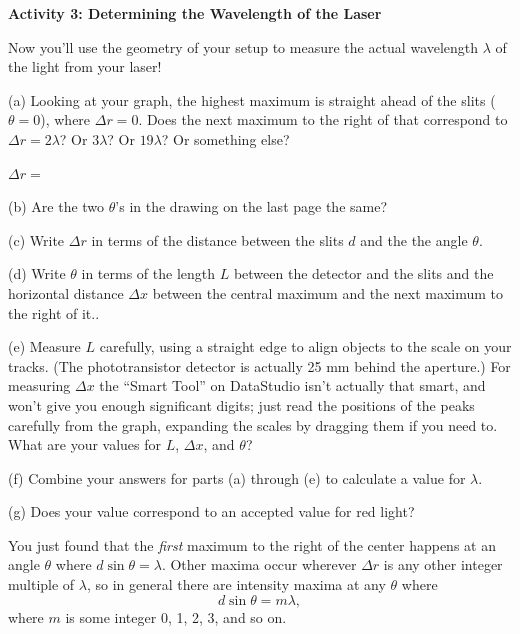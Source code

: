 \pagebreak[2]
\textbf{Activity 3: Determining the Wavelength of the Laser }

Now you'll use the geometry of your setup to measure the actual wavelength $\lambda$ of the light from your laser!

(a) Looking at your graph, the highest maximum is straight ahead of the slits ($\theta=0$), where $\Delta r=0$.  Does the next maximum to the right of that correspond to $\Delta r=2\lambda$?  Or $3\lambda$?  Or $19\lambda$?  Or something else?

\vspace{0.1in}
\hspace{0.8in}$\Delta r=$
\vspace{0.1in}

(b) Are the two $\theta$'s in the drawing on the last page the same?
\answerspace{0.3in}

(c) Write $\Delta r$ in terms of the distance between the slits $d$ and the the angle $\theta$.
\answerspace{0.5in}

(d) Write $\theta$ in terms of the length $L$ between the detector and the slits and the horizontal distance $\Delta x$ between the central maximum and the next maximum to the right of it..
\answerspace{0.5in}

(e) Measure $L$ carefully, using a straight edge to align objects to the scale on your tracks.  (The phototransistor detector is actually 25 mm behind the aperture.)  For measuring $\Delta x$ the ``Smart Tool'' on DataStudio isn't actually that smart, and won't give you enough significant digits; just read the positions of the peaks carefully from the graph, expanding the scales by dragging them if you need to.  What are your values for $L$, $\Delta x$, and $\theta$?
\answerspace{0.8in}

(f) Combine your answers for parts (a) through (e) to calculate a value for $\lambda$.  
\answerspace{1in}

(g) Does your value correspond to an accepted value for red light?
\answerspace{0.3in}

You just found that the \textit{first} maximum to the right of the center happens at an angle $\theta$ where $d \sin \theta = \lambda$.  Other maxima occur wherever $\Delta r$ is any other integer multiple of $\lambda$, so in general there are intensity maxima at any $\theta$ where
\begin{displaymath}
d \sin \theta = m \lambda,
\end{displaymath}
where $m$ is some integer 0, 1, 2, 3, and so on.  


